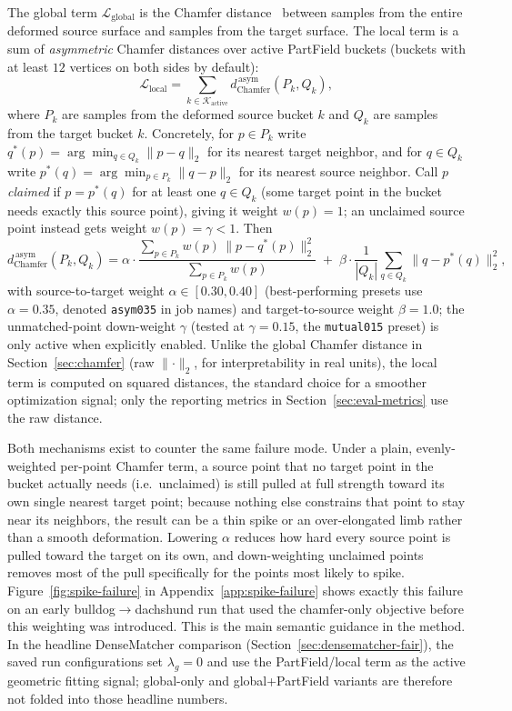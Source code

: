 \documentclass{article}
\begin{document}
The global term $\mathcal{L}_{\mathrm{global}}$ is the Chamfer distance~\cite{psgn} between samples
from the entire deformed source surface and samples from the target surface. The local term is a sum of \emph{asymmetric} Chamfer distances over active PartField buckets
(buckets with at least $12$ vertices on both sides by default):
\[
\mathcal{L}_{\mathrm{local}} =
\sum_{k \in \mathcal{K}_{\mathrm{active}}}
d^{\,\mathrm{asym}}_{\mathrm{Chamfer}}(P_k,Q_k),
\]
where $P_k$ are samples from the deformed source bucket $k$ and $Q_k$ are samples from the target
bucket $k$. Concretely, for $p \in P_k$ write $q^*(p) = \arg\min_{q \in Q_k}\lVert p-q\rVert_2$ for
its nearest target neighbor, and for $q \in Q_k$ write $p^*(q) = \arg\min_{p \in P_k}\lVert
q-p\rVert_2$ for its nearest source neighbor. Call $p$ \emph{claimed} if $p = p^*(q)$ for at least
one $q \in Q_k$ (some target point in the bucket needs exactly this source point), giving it weight
$w(p) = 1$; an unclaimed source point instead gets weight $w(p) = \gamma < 1$. Then
\[
d^{\,\mathrm{asym}}_{\mathrm{Chamfer}}(P_k,Q_k) =
\alpha \cdot \frac{\sum_{p \in P_k} w(p)\,\lVert p-q^*(p)\rVert_2^2}{\sum_{p \in P_k} w(p)}
\;+\;
\beta \cdot \frac{1}{|Q_k|}\sum_{q \in Q_k}\lVert q-p^*(q)\rVert_2^2 ,
\]
with source-to-target weight $\alpha \in [0.30,0.40]$ (best-performing presets use $\alpha=0.35$,
denoted \texttt{asym035} in job names) and target-to-source weight $\beta = 1.0$; the unmatched-point
down-weight $\gamma$ (tested at $\gamma=0.15$, the \texttt{mutual015} preset) is only active when
explicitly enabled. Unlike the global Chamfer distance in Section~\ref{sec:chamfer} (raw
$\lVert\cdot\rVert_2$, for interpretability in real units), the local term is computed on squared
distances, the standard choice for a smoother optimization signal; only the reporting metrics in
Section~\ref{sec:eval-metrics} use the raw distance.

Both mechanisms exist to counter the same failure mode. Under a plain, evenly-weighted per-point
Chamfer term, a source point that no target point in the bucket actually needs (i.e.\ unclaimed) is
still pulled at full strength toward its own single nearest target point; because nothing else
constrains that point to stay near its neighbors, the result can be a thin spike or an
over-elongated limb rather than a smooth deformation. Lowering $\alpha$ reduces how hard every
source point is pulled toward the target on its own, and down-weighting unclaimed points removes
most of the pull specifically for the points most likely to spike. Figure~\ref{fig:spike-failure} in
Appendix~\ref{app:spike-failure} shows exactly this failure on an early bulldog$\to$dachshund run
that used the chamfer-only objective before this weighting was introduced. This is the main semantic
guidance in the method. In the headline DenseMatcher comparison (Section~\ref{sec:densematcher-fair}),
the saved run configurations set $\lambda_g=0$ and use the PartField/local term as the active
geometric fitting signal; global-only and global+PartField variants are therefore not folded into
those headline numbers.
\end{document}
